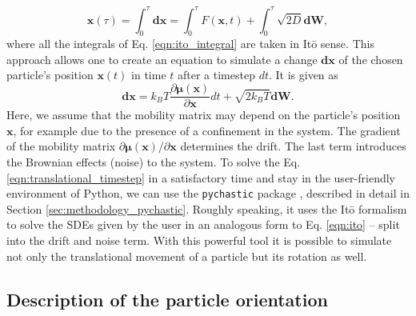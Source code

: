 \documentclass{master_thesis}
\def\code#1{\texttt{#1}}
\begin{document}
\begin{equation}
    \boldsymbol{x}(\tau) = \int_0^{\tau}\boldsymbol{dx}=\int_0^{\tau} F(\boldsymbol{x},t) + \int_0^{\tau}\sqrt{2D}\boldsymbol{dW},
\label{eqn:ito_integral}
\end{equation}
where all the integrals of Eq. \eqref{eqn:ito_integral} are taken in Itō sense. This approach allows one to create an equation to simulate a change $\boldsymbol{dx}$ of the chosen particle's position $\boldsymbol{x}(t)$ in time $t$ after a timestep $dt$. It is given as
\begin{equation}
    \boldsymbol{dx} = k_BT\frac{\partial\bm{\mu}(\boldsymbol{x})}{\partial \boldsymbol{x}} dt + \sqrt{2 k_B T} \boldsymbol{dW}.
\label{eqn:translational_timestep}
\end{equation}
Here, we assume that the mobility matrix may depend on the particle's position $\boldsymbol{x}$, for example due to the presence of a confinement in the system. The gradient of the mobility matrix $\partial \bm{\mu}(\boldsymbol{x}) / \partial \boldsymbol{x}$ determines the drift. The last term introduces the Brownian effects (noise) to the system. To solve the Eq. \eqref{eqn:translational_timestep} in a satisfactory time and stay in the user-friendly environment of Python, we can use the \code{pychastic} package \cite{waszkiewicz2023}, described in detail in Section \ref{sec:methodology_pychastic}. Roughly speaking, it uses the Itō formalism to solve the SDEs given by the user in an analogous form to Eq. \eqref{eqn:ito} -- split into the drift and noise term. With this powerful tool it is possible to simulate not only the translational movement of a particle but its rotation as well.

\subsection{Description of the particle orientation} \label{sec:evensen_theory}
\end{document}
